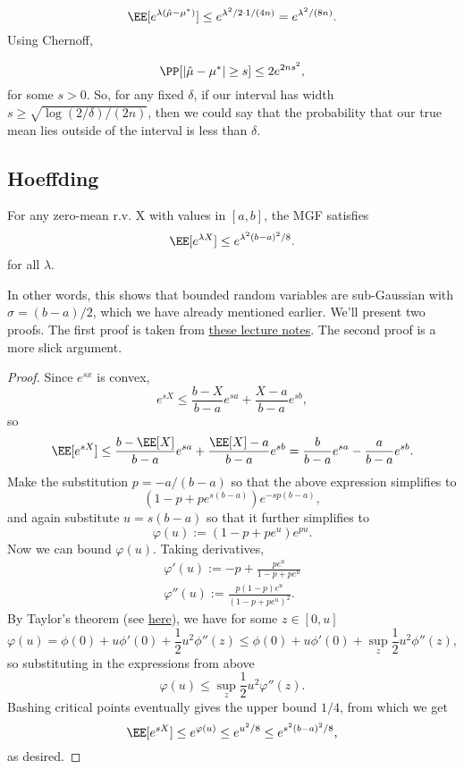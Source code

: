 \[\EE[e^{\lambda(\hat{\mu}-\mu^*)}] \leq e^{\lambda^2/2\cdot 1/(4n)} = e^{\lambda^2/(8n)}.\]
Using Chernoff,

\[\PP[\vert \hat{\mu}-\mu^*\vert \geq s] \leq 2e^{2ns^2},\] 
for some $s > 0$. So, for any fixed $\delta$, if our interval has width $s \geq \sqrt{\log(2/\delta) / (2n)}$, then we could say that the probability that our true mean lies outside of the interval is less than $\delta$.

\subsection{Hoeffding}

\begin{theorem}

For any zero-mean r.v. X with values in $[a,b]$, the MGF satisfies 
\[\EE[e^{\lambda X}] \leq e^{\lambda^2 (b-a)^2 / 8}.\]
for all $\lambda$.
\end{theorem}
In other words, this shows that bounded random variables are sub-Gaussian with $\sigma=(b-a)/2$, which we have already mentioned earlier. We'll present two proofs. The first proof is taken from \href{https://courses.cs.washington.edu/courses/cse521/21au/521-lecture-3.pdf}{these lecture notes}. The second proof is a more slick argument. 

\begin{proof}
Since $e^{sx}$ is convex, 
\[e^{sX}\leq \frac{b-X}{b-a}e^{sa} + \frac{X-a}{b-a}e^{sb},\] 
so 
\[\EE[e^{sX}]\leq \frac{b-\EE[X]}{b-a}e^{sa} + \frac{\EE[X]-a}{b-a}e^{sb} = \frac{b}{b-a}e^{sa}-\frac{a}{b-a}e^{sb}.\] 
Make the substitution $p = -a/(b-a)$ so that the above expression simplifies to
\[(1-p+pe^{s(b-a)})e^{-sp(b-a)},\] 
and again substitute $u=s(b-a)$ so that it further simplifies to
\[\varphi(u) := (1-p+pe^u)e^{pu}.\]
Now we can bound $\varphi(u)$. Taking derivatives, 
\begin{align*}
	\varphi'(u) := -p+\frac{pe^u}{1-p+pe^u} \\
	\varphi''(u) := \frac{p(1-p)e^u}{(1-p+pe^u)^2}. 
\end{align*}
By Taylor's theorem (see \href{https://math.stackexchange.com/questions/3238111/application-of-taylors-theorem-find-upper-bound-for-remainder}{here}), we have for some $z\in [0,u]$
\[\varphi(u) = \phi(0) + u\phi'(0) + \frac{1}{2}u^2\phi''(z)\leq \phi(0) + u\phi'(0) + \sup_z \frac{1}{2}u^2\phi''(z),\]
so substituting in the expressions from above 
\[\varphi(u) \leq \sup_z \frac{1}{2}u^2 \varphi''(z).\] 
Bashing critical points eventually gives the upper bound $1/4$, from which we get 
\[\EE[e^{sX}]\leq e^{\varphi(u)} \leq e^{u^2/8} \leq e^{s^2(b-a)^2/8},\]
as desired.
\end{proof}

